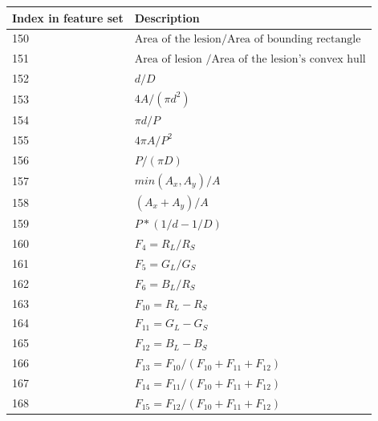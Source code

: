 \documentclass{kththesis}
\begin{document}
  \begin{table}[]
    \begin{tabular}{|l|l|}
    \hline
    Index in feature set & Description \\ \hline
    150                  &    \( \textrm{Area of the lesion} / \textrm{Area of bounding rectangle} \)        \\ \hline
    151                  &       \( \textrm{Area of lesion } / \textrm{Area of the lesion's convex hull} \)      \\ \hline
    152                  &      \(d / D\)       \\ \hline
    153                  &       \(4A/  (\pi d^2)  \)      \\ \hline
    154                  &       \(\pi d /P\)      \\ \hline
    155                  &       \(4\pi A/P^2\)      \\ \hline
    156                  &       \(P/(\pi D)\)      \\ \hline
    157                  &       \(min(A_x , A_y) /A\)      \\ \hline
    158                  &       \((A_x + A_y)/A\)      \\ \hline
    159                  &       \(P*(1/d - 1/D)\)      \\ \hline
    160                  &       \(F_4 = R_L /R_S\)      \\ \hline
    161                  &       \(F_5 = G_L / G_S\)      \\ \hline
    162                  &       \(F_6 = B_L / R_S\)      \\ \hline
    163                  &       \(F_{10} = R_L - R_S\)      \\ \hline
    164                  &       \(F_{11} = G_L - G_S\)      \\ \hline
    165                  &       \(F_{12} =B_L - B_S\)      \\ \hline
    166                  &       \(F_{13} =F_{10} / (F_{10} + F_{11} + F_{12})\)      \\ \hline
    167                  &       \(F_{14} =F_{11} / (F_{10} + F_{11} + F_{12})\)      \\ \hline
    168                  &       \(F_{15} =F_{12} / (F_{10} + F_{11} + F_{12})\)      \\ \hline
    \end{tabular}
    \label{feature_description}
    \end{table}
\end{document}
